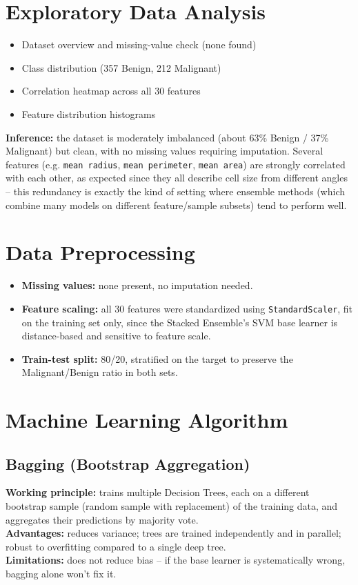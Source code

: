\documentclass[12pt,a4paper]{article}
\begin{document}
\section{Exploratory Data Analysis}
\begin{itemize}
\item Dataset overview and missing-value check (none found)
\item Class distribution (357 Benign, 212 Malignant)
\item Correlation heatmap across all 30 features
\item Feature distribution histograms
\end{itemize}

\textbf{Inference:} the dataset is moderately imbalanced (about 63\% Benign / 37\%
Malignant) but clean, with no missing values requiring imputation. Several
features (e.g. \texttt{mean radius}, \texttt{mean perimeter}, \texttt{mean area})
are strongly correlated with each other, as expected since they all describe cell
size from different angles -- this redundancy is exactly the kind of setting where
ensemble methods (which combine many models on different feature/sample subsets)
tend to perform well.

\section{Data Preprocessing}
\begin{itemize}
\item \textbf{Missing values:} none present, no imputation needed.
\item \textbf{Feature scaling:} all 30 features were standardized using
\texttt{StandardScaler}, fit on the training set only, since the Stacked
Ensemble's SVM base learner is distance-based and sensitive to feature scale.
\item \textbf{Train-test split:} 80/20, stratified on the target to preserve the
Malignant/Benign ratio in both sets.
\end{itemize}

\section{Machine Learning Algorithm}

\subsection*{Bagging (Bootstrap Aggregation)}
\textbf{Working principle:} trains multiple Decision Trees, each on a different
bootstrap sample (random sample with replacement) of the training data, and
aggregates their predictions by majority vote.\\
\textbf{Advantages:} reduces variance; trees are trained independently and in
parallel; robust to overfitting compared to a single deep tree.\\
\textbf{Limitations:} does not reduce bias -- if the base learner is systematically
wrong, bagging alone won't fix it.
\end{document}
